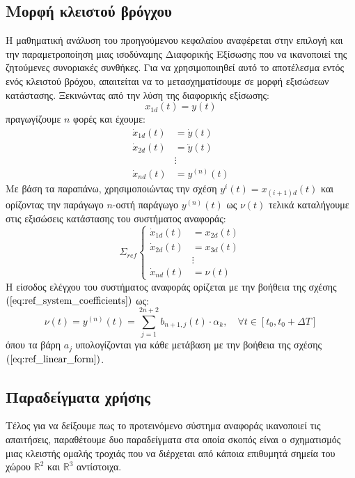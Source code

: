 \subsection{Μορφή κλειστού βρόγχου}
Η μαθηματική ανάλυση του προηγούμενου κεφαλαίου αναφέρεται στην επιλογή και την παραμετροποίηση μιας ισοδύναμης Διαφορικής Εξίσωσης που να ικανοποιεί της ζητούμενες συνοριακές συνθήκες. Για να χρησιμοποιηθεί αυτό το αποτέλεσμα εντός ενός κλειστού βρόχου, απαιτείται να το μετασχηματίσουμε σε μορφή εξισώσεων κατάστασης. Ξεκινώντας από την λύση της διαφορικής εξίσωσης:
\begin{equation*}
	x_{1d}(t) = y(t)
\end{equation*}
πραγωγίζουμε $n$ φορές και έχουμε:
\begin{equation*}
\begin{split}
	\dot{x}_{1d}(t) &= \dot{y}(t)  \\
	\dot{x}_{2d}(t) &= \ddot{y}(t) \\
	& \vdots \\
	\dot{x}_{nd}(t) &= y^{(n)}(t)
\end{split}
\end{equation*}
Με βάση τα παραπάνω, χρησιμοποιώντας την σχέση $y^{i}(t) = x_{(i+1)d}(t)$ και ορίζοντας την παράγωγο $n$-οστή παράγωγο $y^{(n)}(t)$ ως $\nu(t)$ τελικά καταλήγουμε στις εξισώσεις κατάστασης του συστήματος αναφοράς:
\begin{equation}
\Sigma_{ref}
\begin{cases}
\dot{x}_{1d}(t) &= x_{2d}(t)  \\
\dot{x}_{2d}(t) &= x_{3d}(t) \\
& \vdots \\
\dot{x}_{nd}(t) &= \nu(t)
\end{cases}
\label{eq:ref_system}
\end{equation}
Η είσοδος ελέγχου του συστήματος αναφοράς ορίζεται με την βοήθεια της σχέσης $(\ref{eq:ref_system_coefficients})$ ως:
\begin{equation*}
	\nu(t) = y^{(n)}(t) = \sum_{j=1}^{2n + 2} b_{n+1,j}(t) \cdot \alpha_k 
	,\quad \forall t \in [t_0,t_0+\Delta T]
\end{equation*}
όπου τα βάρη $a_j$ υπολογίζονται για κάθε μετάβαση με την βοήθεια της σχέσης $(\ref{eq:ref_linear_form})$.

\subsection{Παραδείγματα χρήσης}
Τέλος για να δείξουμε πως το προτεινόμενο σύστημα αναφοράς ικανοποιεί τις απαιτήσεις, παραθέτουμε δυο παραδείγματα στα οποία σκοπός είναι ο σχηματισμός μιας κλειστής ομαλής τροχιάς που να διέρχεται από κάποια επιθυμητά σημεία του χώρου $\mathbb{R}^2$ και $\mathbb{R}^3$ αντίστοιχα.

